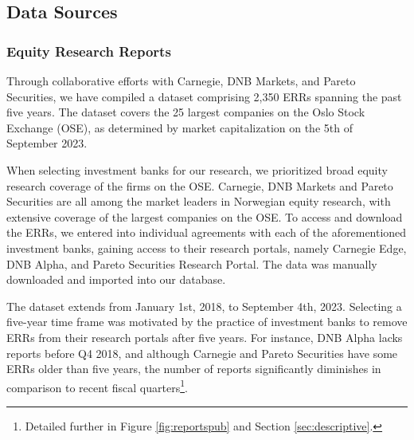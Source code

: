 

\subsection{Data Sources}

\subsubsection{Equity Research Reports}

Through collaborative efforts with Carnegie, DNB Markets, and Pareto Securities, we have compiled a dataset comprising 2,350 ERRs spanning the past five years. The dataset covers the 25 largest companies on the Oslo Stock Exchange (OSE), as determined by market capitalization on the 5th of September 2023.  



When selecting investment banks for our research, we prioritized broad equity research coverage of the firms on the OSE. Carnegie, DNB Markets and Pareto Securities are all among the market leaders in Norwegian equity research, with extensive coverage of the largest companies on the OSE. To access and download the ERRs, we entered into individual agreements with each of the aforementioned investment banks, gaining access to their research portals, namely Carnegie Edge, DNB Alpha, and Pareto Securities Research Portal. The data was manually downloaded and imported into our database.

The dataset extends from January 1st, 2018, to September 4th, 2023. Selecting a five-year time frame was motivated by the practice of investment banks to remove ERRs from their research portals after five years. For instance, DNB Alpha lacks reports before Q4 2018, and although Carnegie and Pareto Securities have some ERRs older than five years, the number of reports significantly diminishes in comparison to recent fiscal quarters\footnote{Detailed further in Figure \ref{fig:reportspub} and Section \ref{sec:descriptive}.}. %

